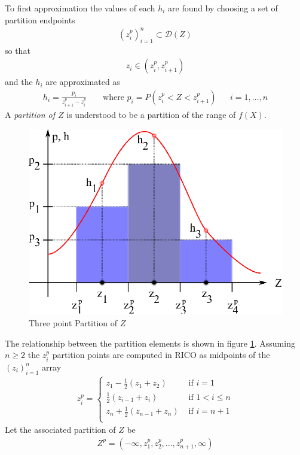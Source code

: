 To first approximation the values of each $h_i$ are found by choosing a set of partition endpoints 
\begin{align*}
(z_i^p)_{i=1}^n \subset \mathcal{D}(Z)
\end{align*}
so that 
\begin{align*}
z_i \in (z_i^p, z_{i+1}^p)
\end{align*}
and the $h_i$ are approximated as
\begin{align*}
h_i = \frac{p_i}{z_{i+1}^p - z_i^p} && \text{ where } p_i = P(z_i^p < Z < z_{i+1}^p) && i = 1,\dots,n
\end{align*}
A \emph{partition of $Z$} is understood to be a partition of the range of $f(X)$.

\begin{figure}
  \centering
  \includegraphics{Images/Zpartition4.eps}
  \caption[Three point Partition of $Z$]
          {Three point Partition of $Z$}
  \label{fig:Zpartition4}
\end{figure}

The relationship between the partition elements is shown in figure \ref{fig:Zpartition4}. Assuming $n \ge 2$ the $z_i^p$ partition points are computed in RICO as midpoints of the $(z_i)_{i=1}^n$ array
\begin{align*}
z_i^p = \begin{cases}
       z_1 - \frac{1}{2}(z_1 + z_2) & \text{ if } i = 1\\
       \frac{1}{2}(z_{i-1} + z_i) & \text{ if } 1 < i \le n\\
       z_n + \frac{1}{2}(z_{n-1} + z_n) & \text{ if } i = n+1\\
      \end{cases}
\end{align*}
Let the associated partition of $Z$ be
\begin{align*}
Z^p =(-\infty, z_1^p, z_2^p, ..., z_{n+1}^p, \infty)
\end{align*}

